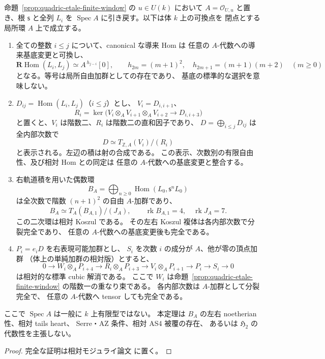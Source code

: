 \begin{theorem}
\label{thm:quadric-local-all-degree-cubic}
命題~\ref{prop:quadric-etale-finite-window} の $u\in U(k)$ において
$A=\mathcal O_{U,u}$ と置き、根 $\mathsf s$ と全列 $L_i$ を
$\operatorname{Spec}A$ に引き戻す。以下は体 $k$ 上の可換点を
閉点とする局所環 $A$ 上で成立する。
\begin{enumerate}
\item 全ての整数 $i\le j$ について、canonical な導来 Hom は
  任意の $A$-代数への導来基底変更と可換し、
  \[
    \mathbf R\operatorname{Hom}(L_i,L_j)
       \simeq A^{\,h_{j-i}}[0],\qquad
    h_{2m}=(m+1)^2,\quad
    h_{2m+1}=(m+1)(m+2)\quad(m\ge0)
  \]
  となる。等号は局所自由加群としての存在であり、
  基底の標準的な選択を意味しない。
\item $D_{ij}=\operatorname{Hom}(L_i,L_j)$（$i\le j$）とし、
  $V_i=D_{i,i+1}$、
  \[
    R_i=\ker\bigl(
      V_i\otimes_A V_{i+1}\otimes_A V_{i+2}
             \longrightarrow D_{i,i+3}\bigr)
  \]
  と置くと、$V_i$ は階数二、$R_i$ は階数二の直和因子であり、
  $D=\bigoplus_{i\le j}D_{ij}$ は全内部次数で
  \[
     D \simeq T_{\mathbb Z,A}(V_i)/(R_i)
     \tag{Loc-cub}\label{eq:quadric-local-cubic-presentation}
  \]
  と表示される。左辺の積は射の合成である。
  この表示、次数別の有限自由性、及び相対 Hom との同定は
  任意の $A$-代数への基底変更と整合する。
\item 右軌道積を用いた偶数環
  \[
    B_A=\bigoplus_{n\ge0}\operatorname{Hom}
                (L_0,\mathsf s^nL_0)
  \]
  は全次数で階数 $(n+1)^2$ の自由 $A$-加群であり、
  \[
      B_A\simeq T_A(B_{A,1})/(J_A),\qquad
      \operatorname{rk}B_{A,1}=4,\quad
      \operatorname{rk}J_A=7.
  \]
  この二次環は相対 Koszul である。
  その左右 Koszul 複体は各内部次数で分裂完全であり、
  任意の $A$-代数への基底変更後も完全である。
\item $P_i=e_iD$ を右表現可能加群とし、
  $S_i$ を次数 $i$ の成分が $A$、他が零の頂点加群
  （体上の単純加群の相対版）とすると、
  \[
  0\longrightarrow W_i\otimes_A P_{i+4}
   \longrightarrow R_i\otimes_A P_{i+3}
   \longrightarrow V_i\otimes_A P_{i+1}
   \longrightarrow P_i\longrightarrow S_i\longrightarrow0
  \tag{Loc-res}\label{eq:quadric-local-cubic-resolution}
  \]
  は相対的な標準 cubic 解消である。
  ここで $W_i$ は命題~\ref{prop:quadric-etale-finite-window}
  の階数一の重なり束である。
  各内部次数は $A$-加群として分裂完全で、
  任意の $A$-代数へ tensor しても完全である。
\end{enumerate}
ここで $\operatorname{Spec}A$ は一般に $k$ 上有限型ではない。
本定理は $B_A$ の左右 noetherian 性、相対 tails heart、
Serre・AZ 条件、相対 AS4 被覆の存在、
あるいは $\mathfrak H_2$ の代数性を主張しない。
\end{theorem}
\begin{proof}
完全な証明は相対モジュライ論文 \cite[\texttt{artin_roots}]{QuadricModuli2026} に置く。
\end{proof}

